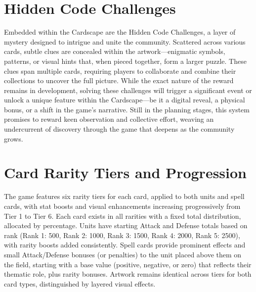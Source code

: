 \section{Hidden Code Challenges}

Embedded within the Cardscape are the Hidden Code Challenges, a layer of mystery designed to intrigue and unite the community. Scattered across various cards, subtle clues are concealed within the artwork---enigmatic symbols, patterns, or visual hints that, when pieced together, form a larger puzzle. These clues span multiple cards, requiring players to collaborate and combine their collections to uncover the full picture. While the exact nature of the reward remains in development, solving these challenges will trigger a significant event or unlock a unique feature within the Cardscape---be it a digital reveal, a physical bonus, or a shift in the game’s narrative. Still in the planning stages, this system promises to reward keen observation and collective effort, weaving an undercurrent of discovery through the game that deepens as the community grows.





\section{Card Rarity Tiers and Progression}

The game features six rarity tiers for each card, applied to both units and spell cards, with stat boosts and visual enhancements increasing progressively from Tier 1 to Tier 6. Each card exists in all rarities with a fixed total distribution, allocated by percentage. Units have starting Attack and Defense totals based on rank (Rank 1: 500, Rank 2: 1000, Rank 3: 1500, Rank 4: 2000, Rank 5: 2500), with rarity boosts added consistently. Spell cards provide prominent effects and small Attack/Defense bonuses (or penalties) to the unit placed above them on the field, starting with a base value (positive, negative, or zero) that reflects their thematic role, plus rarity bonuses. Artwork remains identical across tiers for both card types, distinguished by layered visual effects.

